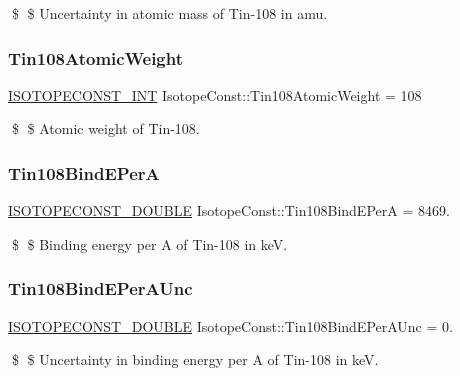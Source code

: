 \$ \$ Uncertainty in atomic mass of Tin-\/108 in amu. \mbox{\label{group___isotope_const-_tin-_sn108_ga1ec716b51e06f592b2b6e031770c7c18}} 
\subsubsection{\texorpdfstring{Tin108\+Atomic\+Weight}{Tin108AtomicWeight}}
{\footnotesize\ttfamily \mbox{\hyperlink{group___isotope_const-_macros_ga5f18360b3e99483a35c32d789e62621c}{I\+S\+O\+T\+O\+P\+E\+C\+O\+N\+S\+T\+\_\+\+I\+NT}} Isotope\+Const\+::\+Tin108\+Atomic\+Weight = 108}

\$ \$ Atomic weight of Tin-\/108. \mbox{\label{group___isotope_const-_tin-_sn108_ga98c921945d34d6dbac42a47effb3781e}} 
\subsubsection{\texorpdfstring{Tin108\+Bind\+E\+PerA}{Tin108BindEPerA}}
{\footnotesize\ttfamily \mbox{\hyperlink{group___isotope_const-_macros_ga8f45a7272ce02c0b4c65c44636ed719a}{I\+S\+O\+T\+O\+P\+E\+C\+O\+N\+S\+T\+\_\+\+D\+O\+U\+B\+LE}} Isotope\+Const\+::\+Tin108\+Bind\+E\+PerA = 8469.}

\$ \$ Binding energy per A of Tin-\/108 in keV. \mbox{\label{group___isotope_const-_tin-_sn108_ga92eddd62606448cab5bd7776f5ba97f3}} 
\subsubsection{\texorpdfstring{Tin108\+Bind\+E\+Per\+A\+Unc}{Tin108BindEPerAUnc}}
{\footnotesize\ttfamily \mbox{\hyperlink{group___isotope_const-_macros_ga8f45a7272ce02c0b4c65c44636ed719a}{I\+S\+O\+T\+O\+P\+E\+C\+O\+N\+S\+T\+\_\+\+D\+O\+U\+B\+LE}} Isotope\+Const\+::\+Tin108\+Bind\+E\+Per\+A\+Unc = 0.}

\$ \$ Uncertainty in binding energy per A of Tin-\/108 in keV. \mbox{\label{group___isotope_const-_tin-_sn108_ga4634919fcc176868d2ed53d66ed87ef0}} 
